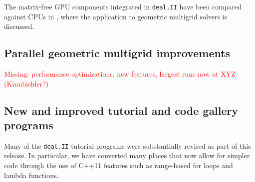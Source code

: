 \documentclass{ansarticle-preprint}
\newcommand{\specialword}[1]{\texttt{#1}}
\newcommand{\dealii}{{\specialword{deal.II}}\xspace}
\begin{document}
The matrix-free GPU components integrated in \dealii have been compared against
CPUs in \cite{KronbichlerLjungkvist2019}, where the application to geometric
multigrid solvers is discussed.

\subsection{Parallel geometric multigrid improvements}
\label{subsec:gmg}

\textcolor{red}{Missing: performance optimizations, new features, largest
runs now at XYZ (Kronbichler?)}

\subsection{New and improved tutorial and code gallery programs}
\label{subsec:steps}

Many of the \dealii{} tutorial programs were substantially revised as
part of this release. In particular, we have converted many places
that now allow for simpler code through the use of C++11 features such
as range-based for loops and lambda functions.
\end{document}
